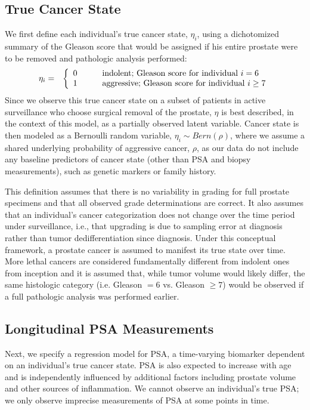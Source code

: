 \documentclass[12pt, letterpaper]{article}
\newcommand{\beas}{\begin{eqnarray*}}
\newcommand{\eeas}{\end{eqnarray*}}
\begin{document}
\subsection{True Cancer State}
We first define each individual's true cancer state, $\eta_i$, using a dichotomized summary of the Gleason score that would be assigned if his entire prostate were to be removed and pathologic analysis performed:
\beas
\eta_i&=&
\left\{
\begin{array}{l l}
0 & \qquad \text{indolent; Gleason score for individual } i=6 \\
1 & \qquad \text{aggressive; Gleason score for individual } i \geq 7\\
\end{array} \right.
\eeas 
Since we observe this true cancer state on a subset of patients in active surveillance who choose surgical removal of the prostate, $\eta$ is best described, in the context of this model, as a partially observed latent variable. Cancer state is then modeled as a Bernoulli random variable, $\eta_i \sim Bern(\rho)$, where we assume a shared underlying probability of aggressive cancer, $\rho$, as our data do not include any baseline predictors of cancer state (other than PSA and biopsy measurements), such as genetic markers or family history.

This definition assumes that there is no variability in grading for full prostate specimens and that all observed grade determinations are correct. It also assumes that an individual's cancer categorization does not change over the time period under surveillance, i.e., that upgrading is due to sampling error at diagnosis rather than tumor dedifferentiation since diagnosis.  Under this conceptual framework, a prostate cancer is assumed to manifest its true state over time. More lethal cancers are considered fundamentally different from indolent ones from inception and it is assumed that, while tumor volume would likely differ, the same histologic category (i.e. Gleason $=6$ vs. Gleason $\geq7$) would be observed if a full pathologic analysis was performed earlier.  

\subsection{Longitudinal PSA Measurements}
Next, we specify a regression model for PSA, a time-varying biomarker dependent on an individual's true cancer state. PSA is also expected to increase with age and is independently influenced by additional factors including prostate volume and other sources of inflammation. We cannot observe an individual's true PSA; we only observe imprecise measurements of PSA at some points in time.
\end{document}
